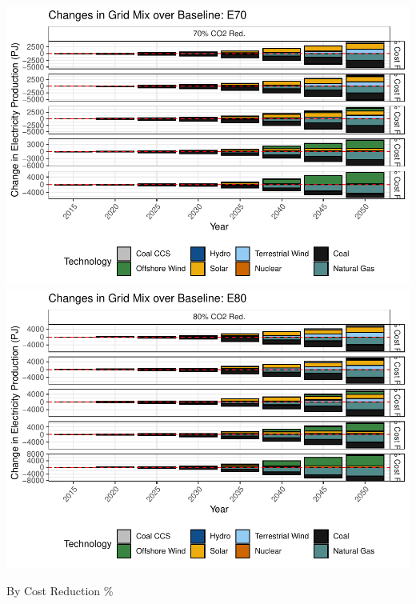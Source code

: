 \documentclass[]{article}
\begin{document}
\includegraphics[width=0.5\linewidth]{osw_Report_files/figure-latex/unnamed-chunk-58-6}
\includegraphics[width=0.5\linewidth]{osw_Report_files/figure-latex/unnamed-chunk-58-7}

By Cost Reduction \%
\end{document}
